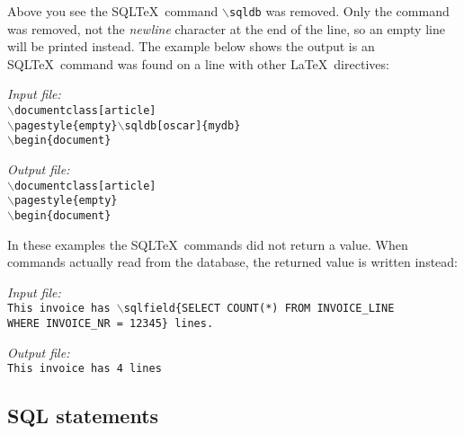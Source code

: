 \documentclass{article}
\newcommand{\bs}{\begin{math}\backslash\end{math}}
\newcommand{\vs}{\vspace{3mm}}
\begin{document}
\vs

Above you see the SQL\TeX\ command \texttt{\bs sqldb} was removed. Only the command was removed, not
the \textsl{newline} character at the end of the line, so an empty line will be printed instead.
The example below shows the output is an SQL\TeX\ command was found on a line with other \LaTeX\
directives:

\vs

\begin{minipage}[t]{0.5\textwidth}\textsl{Input file:}\\\texttt{\footnotesize{\bs documentclass[article] \\
\bs pagestyle\{empty\}\bs sqldb[oscar]\{mydb\} \\
\bs begin\{document\} \\
\hrulefill}}\end{minipage}\hfill\begin{minipage}[t]{0.5\textwidth}\textsl{Output file:}\\\texttt{\footnotesize{\bs documentclass[article] \\
\bs pagestyle\{empty\} \\
\bs begin\{document\} \\
}}\end{minipage}

\vs

In these examples the SQL\TeX\ commands did not return a value. When commands actually read from
the database, the returned value is written instead:

\vs

\begin{minipage}[t]{0.5\textwidth}\textsl{Input file:}\\\texttt{\footnotesize{This invoice has \bs sqlfield\{SELECT COUNT(*) FROM INVOICE\_LINE \\
WHERE INVOICE\_NR = 12345\} lines.\\
\hrulefill}}\end{minipage}\hfill\begin{minipage}[t]{0.5\textwidth}\textsl{Output file:}\\\texttt{\footnotesize{This invoice has 4 lines \\
}}\end{minipage}

\subsection{SQL statements}\label{sqlstatements}
\end{document}
